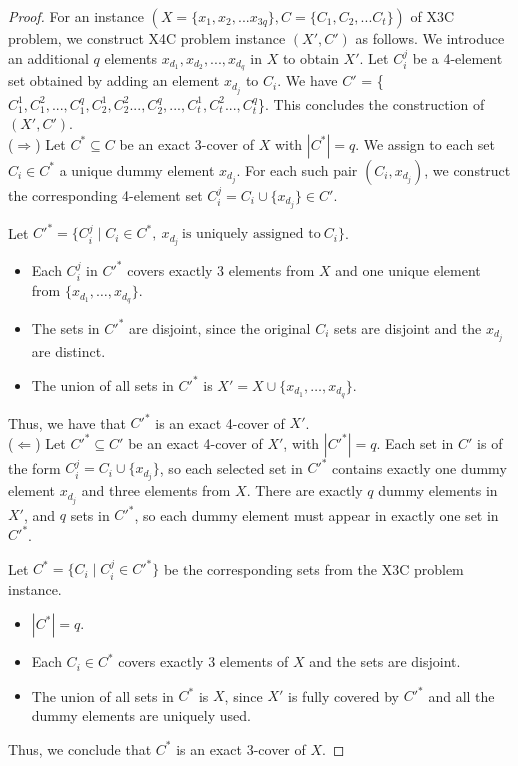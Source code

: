 \documentclass[preprint,12pt]{elsarticle}
\begin{document}
\begin{proof}
    For an instance $(X = \{x_1,x_2,...x_{3q}\}, C = \{C_1,C_2,...C_t\})$ of X3C problem, we construct X4C problem instance $(X', C')$ as follows. We introduce an additional $q$ elements $x_{d_1}, x_{d_2},...,x_{d_q}$ in $X$ to obtain $X'$. Let $C_i^j$ be a 4-element set obtained by adding an element $x_{d_j}$ to $C_i$. We have $C'$ = \{$C_{1}^1, C_{1}^2 ,..., C_{1}^q, C_{2}^1,C_{2}^2 ..., C_{2}^q, ..., C_{t}^1,C_{t}^2 ..., C_{t}^q$\}. This concludes the construction of $(X', C')$. \\

\noindent ($\Rightarrow$) Let $C^* \subseteq C$ be an exact 3-cover of $X$ with $|C^*| = q$. We assign to each set $C_i \in C^*$ a unique dummy element $x_{d_j}$. For each such pair $(C_i, x_{d_j})$, we construct the corresponding 4-element set $C_i^j = C_i \cup \{x_{d_j}\} \in C'$.

Let $C'^* = \{C_i^j \mid C_i \in C^*,\ x_{d_j}\ \text{is uniquely assigned to}\ C_i\}$.

\begin{itemize}
    \item Each $C_i^j$ in $C'^*$ covers exactly 3 elements from $X$ and one unique element from $\{x_{d_1}, \dots, x_{d_q}\}$.
    \item The sets in $C'^*$ are disjoint, since the original $C_i$ sets are disjoint and the $x_{d_j}$ are distinct.
    \item The union of all sets in $C'^*$ is $X' = X \cup \{x_{d_1}, \dots, x_{d_q}\}$.
\end{itemize}

Thus, we have that $C'^*$ is an exact 4-cover of $X'$. \\

\noindent ($\Leftarrow$) Let $C'^* \subseteq C'$ be an exact 4-cover of $X'$, with $|C'^*| = q$. Each set in $C'$ is of the form $C_i^j = C_i \cup \{x_{d_j}\}$, so each selected set in $C'^*$ contains exactly one dummy element $x_{d_j}$ and three elements from $X$. There are exactly $q$ dummy elements in $X'$, and $q$ sets in $C'^*$, so each dummy element must appear in exactly one set in $C'^*$.

Let $C^* = \{C_i \mid C_i^j \in C'^*\}$ be the corresponding sets from the X3C problem instance.

\begin{itemize}
    \item $|C^*| = q$.
    \item Each $C_i \in C^*$ covers exactly 3 elements of $X$ and the sets are disjoint.
    \item The union of all sets in $C^*$ is $X$, since $X'$ is fully covered by $C'^*$ and all the dummy elements are uniquely used.
\end{itemize}

Thus, we conclude that $C^*$ is an exact 3-cover of $X$.
\end{proof}
\end{document}
